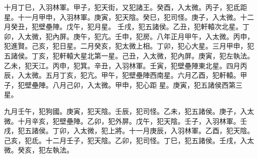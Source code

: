 \begin{pinyinscope}
 十月丁巳，入羽林軍。甲子，犯天街，又犯諸王。癸酉，入太微。丙子，犯氐距星。十一月甲申，入羽林軍。庚寅，犯天陰。癸巳，犯司怪。庚子，入太微。十二月癸丑，犯壁壘陣。戊午，犯月星。
 壬戌，犯五諸侯。乙丑，犯軒轅次北星。丁卯，入太微，犯內屏。庚午，犯亢。壬申，犯房。八年正月甲午，入太微。丙申，犯進賢。己亥，犯日星。二月癸亥，犯太微上相。丁卯，犯心大星。三月甲申，犯五諸侯。丁亥，犯軒轅大星北第一星。己丑，入太微，犯內屏。庚寅，犯左執法。乙未，犯天江。丙申，犯箕。辛丑，入羽林軍。壬寅，犯壁壘陣東北星。四月丙辰，入太微。五月丁亥，犯亢。甲午，犯壁壘陣西南星。六月乙酉，犯軒轅。甲子，犯壁壘陣。八月己卯，入太微。甲申，犯心距
 星。庚寅，犯五諸侯西第三星。



 九月壬午，犯狗國。庚寅，犯天陰。壬辰，犯司怪。乙未，犯五諸侯。庚子，入太微。十月辛亥，犯壁壘陣。乙卯，犯外屏。戊午，犯天陰。壬子，入羽林軍。壬戌，犯五諸侯。丁卯，入太微，犯上將。十一月庚辰，入羽林軍。乙酉，犯天陰。己亥，犯氐。十二月壬子，犯天陰。乙卯，犯司怪。丁巳，犯五諸侯。壬戌，入太微。癸亥，犯左執法。




\end{pinyinscope}

